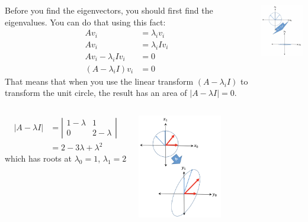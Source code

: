 \documentclass{beamer}
\begin{document}
\begin{frame}
  \begin{columns}[t]
    \column{2.75in}
    \begin{block}{}
      Before you find the eigenvectors, you should first find
      the eigenvalues.  You can do that using this fact:
      \begin{align*}
        A{v}_i &= \lambda_i{v}_i\\
        A{v}_i &= \lambda_i I{v}_i\\
        A{v}_i-\lambda_i I{v}_i &={0}\\
        (A-\lambda_i I){v}_i &= {0}
      \end{align*}
      That means that when you use the linear transform
      $(A-\lambda_i I)$ to transform the unit circle, the result has an
      area of $|A-\lambda I|=0$.
    \end{block}
    \column{1.5in}
    \begin{block}{}
      \includegraphics[width=1.45in]{linalg_review_fig3.png}
    \end{block}
  \end{columns}
\end{frame}

\begin{frame}
  \begin{columns}[t]
    \column{2.75in}
    \begin{block}{}
      \begin{align*}
        |A-\lambda I| &=
        \left|\begin{array}{cc}1-\lambda&1\\0&2-\lambda\end{array}\right|\\
        &=2-3\lambda+\lambda^2
      \end{align*}
      which has roots at $\lambda_0=1$, $\lambda_1=2$
    \end{block}
    \column{1.5in}
    \begin{block}{}
      \includegraphics[width=1.45in]{linalg_review_fig2.png}
    \end{block}
  \end{columns}
\end{frame}
\end{document}
